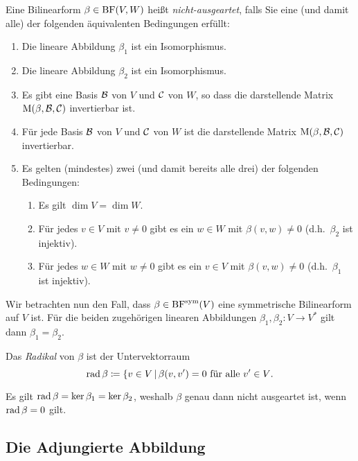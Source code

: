 \begin{definition}
  Eine Bilinearform $\beta \in \operatorname{BF}(V,W)$ heißt \emph{nicht-ausgeartet}, falls Sie eine (und damit alle) der folgenden äquivalenten Bedingungen erfüllt:
  \begin{enumerate}
    \item
      Die lineare Abbildung $\beta_1$ ist ein Isomorphismus.
    \item
      Die lineare Abbildung $\beta_2$ ist ein Isomorphismus.
    \item
      Es gibt eine Basis $\mathcal{B}$ von $V$ und $\mathcal{C}$ von $W$, so dass die darstellende Matrix $\operatorname{M}(\beta, \mathcal{B}, \mathcal{C})$ invertierbar ist.
    \item
      Für jede Basis $\mathcal{B}$ von $V$ und $\mathcal{C}$ von $W$ ist die darstellende Matrix $\operatorname{M}(\beta, \mathcal{B}, \mathcal{C})$ invertierbar.
    \item
      Es gelten (mindestes) zwei (und damit bereits alle drei) der folgenden Bedingungen:
      \begin{enumerate}
        \item
          Es gilt $\dim V = \dim W$.
        \item
          Für jedes $v \in V$ mit $v \neq 0$ gibt es ein $w \in W$ mit $\beta(v,w) \neq 0$ (d.h.\ $\beta_2$ ist injektiv).
        \item
          Für jedes $w \in W$ mit $w \neq 0$ gibt es ein $v \in V$ mit $\beta(v,w) \neq 0$ (d.h.\ $\beta_1$ ist injektiv).
      \end{enumerate}
  \end{enumerate}
\end{definition}

Wir betrachten nun den Fall, dass $\beta \in \operatorname{BF}^{\operatorname{sym}}(V)$ eine symmetrische Bilinearform auf $V$ ist.
Für die beiden zugehörigen linearen Abbildungen $\beta_1, \beta_2 \colon V \to V^*$ gilt dann $\beta_1 = \beta_2$.

\begin{definition}
  Das \emph{Radikal} von $\beta$ ist der Untervektorraum
  \[
              \operatorname{rad} \beta
    \coloneqq \{v \in V \,|\, \text{$\beta(v,v') = 0$ für alle $v' \in V$}.
  \]
\end{definition}

Es gilt $\operatorname{rad} \beta = \ker \beta_1 = \ker \beta_2$, weshalb $\beta$ genau dann nicht ausgeartet ist, wenn $\operatorname{rad} \beta = 0$ gilt.



\subsection{Die Adjungierte Abbildung}

